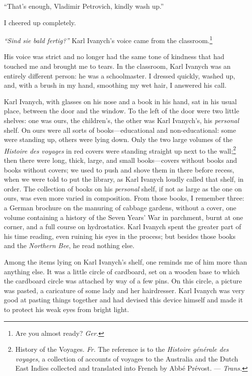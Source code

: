 ``That's enough, Vladimir Petrovich, kindly wash up.'' %

I cheered up completely.

\textit{``Sind sie bald fertig?''} Karl Ivanych's voice came from the classroom.\footnote{Are you almost ready? \textit{Ger.}} %

His voice was strict and no longer had the same tone of kindness that had touched me and brought me to tears. In the classroom, Karl Ivanych was an entirely different person: he was a schoolmaster. I dressed quickly, washed up, and, with a brush in my hand, smoothing my wet hair, I answered his call.

Karl Ivanych, with glasses on his nose and a book in his hand, sat in his usual place, between the door and the window. To the left of the door were two little shelves: one was ours, the children's, the other was Karl Ivanych's, his \emph{personal} shelf. On ours were all sorts of books---educational and non-educational: some were standing up, others were lying down. Only the two large volumes of the \textit{Histoire des voyages} in red covers were standing straight up next to the wall;\footnote{History of the Voyages. \textit{Fr.} The reference is to the \textit{Histoire g\'en\'erale des voyages}, a collection of accounts of voyages to the Australia and the Dutch East Indies collected and translated into French by Abb\'e Pr\'evost. --- \textit{Trans.}} then there were long, thick, large, and small books---covers without books and books without covers; we used to push and shove them in there before recess, when we were told to put the library, as Karl Ivanych loudly called that shelf, in order. The collection of books on his \emph{personal} shelf, if not as large as the one on ours, was even more varied in composition. From those books, I remember three: a German brochure on the manuring of cabbage gardens, without a cover, one volume containing a history of the Seven Years' War in parchment, burnt at one corner, and a full course on hydrostatics. Karl Ivanych spent the greater part of his time reading, even ruining his eyes in the process; but besides those books and the \textit{Northern Bee}, he read nothing else.

Among the items lying on Karl Ivanych's shelf, one reminds me of him more than anything else. It was a little circle of cardboard, set on a wooden base to which the cardboard circle was attached by way of a few pins. On this circle, a picture was pasted, a caricature of some lady and her hairdresser. Karl Ivanych was very good at pasting things together and had devised this device himself and made it to protect his weak eyes from bright light.

